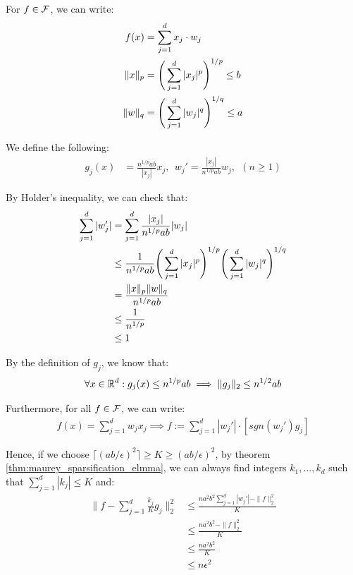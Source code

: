 \begin{proof*}
    For $f\in\mathcal{F}$, we can write:
    \begin{align*}
        f(x) &= \sum_{j=1}^d x_j \cdot w_j \\
        \|x\|_p &= \Bigg( 
            \sum_{j=1}^d |x_j|^p
         \Bigg)^{1/p} \le b \\
        \|w\|_q &= \Bigg( 
            \sum_{j=1}^d |w_j|^q
         \Bigg)^{1/q} \le a
    \end{align*}

    \noindent We define the following:
    \begin{align*}
        g_j(x) &= \frac{n^{1/p}ab}{|x_j|}x_j, \ \ w_j' = \frac{|x_j|}{n^{1/p}ab}w_j, \ \ (n\ge1)
    \end{align*}

    \noindent By Holder's inequality, we can check that:
    \begin{align*}
        \sum_{j=1}^d |w_j'| 
            &= \sum_{j=1}^d \frac{|x_j|}{n^{1/p}ab} |w_j| \\
            &\le \frac{1}{n^{1/p}ab}\Bigg( 
                \sum_{j=1}^d |x_j|^p
             \Bigg)^{1/p}\Bigg( 
                \sum_{j=1}^d |w_j|^q 
             \Bigg)^{1/q} \\
            &= \frac{\|x\|_p \|w\|_q}{n^{1/p}ab} \\
            &\le \frac{1}{n^{1/p}} \\
            &\le 1
    \end{align*}

    \noindent By the definition of $g_j$, we know that:
    \begin{align*}
        \forall x \in \mathbb{R}^d : g_j(x) \le n^{1/p}ab \implies \|g_j\|_2 \le n^{1/2}ab
    \end{align*}

    \noindent Furthermore, for all $f\in\mathcal{F}$, we can write:
    \begin{align*}
        f(x) = \sum_{j=1}^d w_j x_j \implies f := \sum_{j=1}^{d}|w_j'|\cdot[sgn(w_j')g_j]
    \end{align*}

    \noindent Hence, if we choose $\lceil (ab/\epsilon)^2 \rceil \ge K \ge (ab/\epsilon)^2$, by theorem \ref{thm:maurey_sparsification_elmma}, we can always find integers $k_1, \dots, k_d$ such that $\sum_{j=1}^{d}|k_j| \le K$ and:
    \begin{align*}
        \Bigg\| 
            f - \sum_{j=1}^{d} \frac{k_j}{K}g_j
        \Bigg\|_2^2 
            &\le \frac{na^2b^2\sum_{j=1}^{d}|w_j'| - \|f\|_2^2}{K} \\
            &\le \frac{na^2b^2 - \|f\|_2^2}{K} \\
            &\le \frac{na^2b^2}{K} \\
            &\le n\epsilon^2
    \end{align*}


\end{proof*}
